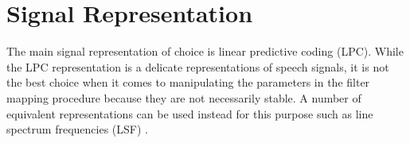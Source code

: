 % 
% 
% 
% 

\section{Signal Representation} %
\label{sec:signal_representation}
The main signal representation of choice is linear predictive coding (LPC). While the LPC representation is a delicate representations of speech signals, it is not the best choice when it comes to manipulating the parameters in the filter mapping procedure because they are not necessarily stable. A number of equivalent representations can be used instead for this purpose such as line spectrum frequencies (LSF) \cite{taletek}.

